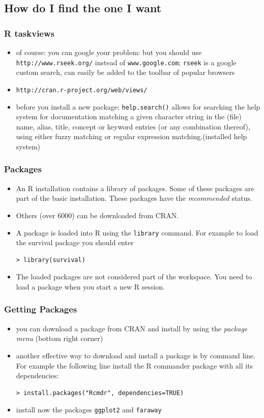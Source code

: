 \documentclass[xcolor={table},c]{beamer}
\begin{document}
\subsection{How do I find the one I want}
\begin{frame}\frametitle{R taskviews}
  \begin{itemize}
    \item of course: you can google your problem: but you should use \texttt{http://www.rseek.org/} instead of \texttt{www.google.com}; \texttt{rseek} is a google custom search, can easily be added to the toolbar of popular browsers 
    \item \texttt{http://cran.r-project.org/web/views/}
    \item before you install a new package: \texttt{help.search()} allows for searching the help system for documentation matching a given character string in the (file) name, alias, title, concept
      or keyword entries (or any combination thereof), using either
      fuzzy matching or regular expression matching.(installed help system)
  \end{itemize}
\end{frame}

\begin{frame}[fragile]\frametitle{Packages}
  \begin{itemize}
  \item An R installation contains a library of packages. Some of these packages are part of the basic installation. These packages have the \emph{ recommended } status.
  \item Others (over 6000) can be downloaded from CRAN.
  \item A package is loaded into R using the \texttt{library} command. For example to load the survival
package you should enter
\begin{verbatim}
> library(survival)
\end{verbatim}
\item The loaded packages are not considered part of the workspace.
You need to load a package when you start a new R session.
\end{itemize}
\end{frame}

\begin{frame}[fragile]\frametitle{Getting Packages}
\begin{itemize}
\item you can download a package from CRAN and install by using the \emph{package menu} (bottom right corner)
\item another effective way to download and install a package is by command line. For example the
following line install the R commander package with all its dependencies:

\begin{verbatim}
> install.packages("Rcmdr", dependencies=TRUE)
\end{verbatim}
\item install now the packages \texttt{ggplot2} and \texttt{faraway}
\end{itemize}
\end{frame}
\end{document}
